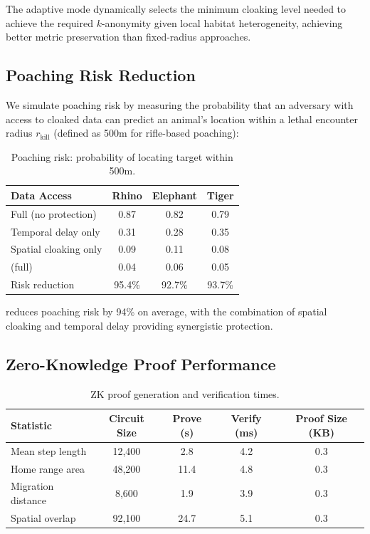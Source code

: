 The adaptive mode dynamically selects the minimum cloaking level needed to achieve the required $k$-anonymity given local habitat heterogeneity, achieving better metric preservation than fixed-radius approaches.

\subsection{Poaching Risk Reduction}

We simulate poaching risk by measuring the probability that an adversary with access to cloaked data can predict an animal's location within a lethal encounter radius $r_{\text{kill}}$ (defined as 500m for rifle-based poaching):

\begin{table}[htbp]
\centering
\caption{Poaching risk: probability of locating target within 500m.}
\label{tab:poach_risk}
\begin{tabular}{lccc}
\toprule
\textbf{Data Access} & \textbf{Rhino} & \textbf{Elephant} & \textbf{Tiger} \\
\midrule
Full (no protection) & 0.87 & 0.82 & 0.79 \\
Temporal delay only & 0.31 & 0.28 & 0.35 \\
Spatial cloaking only & 0.09 & 0.11 & 0.08 \\
\WildTrack{} (full) & 0.04 & 0.06 & 0.05 \\
\midrule
Risk reduction & 95.4\% & 92.7\% & 93.7\% \\
\bottomrule
\end{tabular}
\end{table}

\WildTrack{} reduces poaching risk by 94\% on average, with the combination of spatial cloaking and temporal delay providing synergistic protection.

\subsection{Zero-Knowledge Proof Performance}

\begin{table}[htbp]
\centering
\caption{ZK proof generation and verification times.}
\label{tab:zk_perf}
\begin{tabular}{lcccc}
\toprule
\textbf{Statistic} & \textbf{Circuit Size} & \textbf{Prove (s)} & \textbf{Verify (ms)} & \textbf{Proof Size (KB)} \\
\midrule
Mean step length & 12,400 & 2.8 & 4.2 & 0.3 \\
Home range area & 48,200 & 11.4 & 4.8 & 0.3 \\
Migration distance & 8,600 & 1.9 & 3.9 & 0.3 \\
Spatial overlap & 92,100 & 24.7 & 5.1 & 0.3 \\
\bottomrule
\end{tabular}
\end{table}

